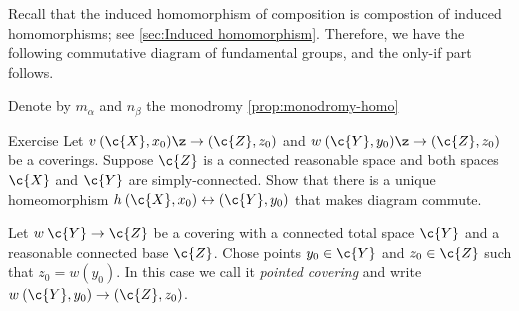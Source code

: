 Recall that the induced homomorphism of composition is compostion of induced homomorphisms; see \ref{sec:Induced homomorphism}.
Therefore, we have the following commutative diagram of fundamental groups,
and the only-if part follows.

\begin{figure}[ht!]
\vskip-0mm
\centering
{}
\end{figure}
\qeds

Denote by $m_\alpha$ and $n_\beta$ the monodromy
\ref{prop:monodromy-homo}














\begin{figure}
\vskip-5mm
\centering
{}
\end{figure}

\begin{thm}{Exercise}\label{ex:ucover-unique}
Let $v\:(\c{X},x_0)\z\to (\c{Z},z_0)$ and $w\:(\c{Y},y_0)\z\to (\c{Z},z_0)$ be a coverings.
Suppose $\c{Z}$ is a connected reasonable space and both spaces $\c{X}$ and $\c{Y}$ are simply-connected.
Show that there is a unique homeomorphism $h\:(\c{X},x_0)\leftrightarrow(\c{Y},y_0)$ that makes diagram commute.
\end{thm}















Let $w\:\c{Y}\to\c{Z}$ be a covering with a connected total space $\c{Y}$ and a reasonable connected base $\c{Z}$.
Chose points $y_0\in \c{Y}$ and $z_0\in \c{Z}$ such that $z_0=w(y_0)$.
In this case we call it \emph{pointed covering} and write $w\:(\c{Y},y_0)\to(\c{Z},z_0)$.

